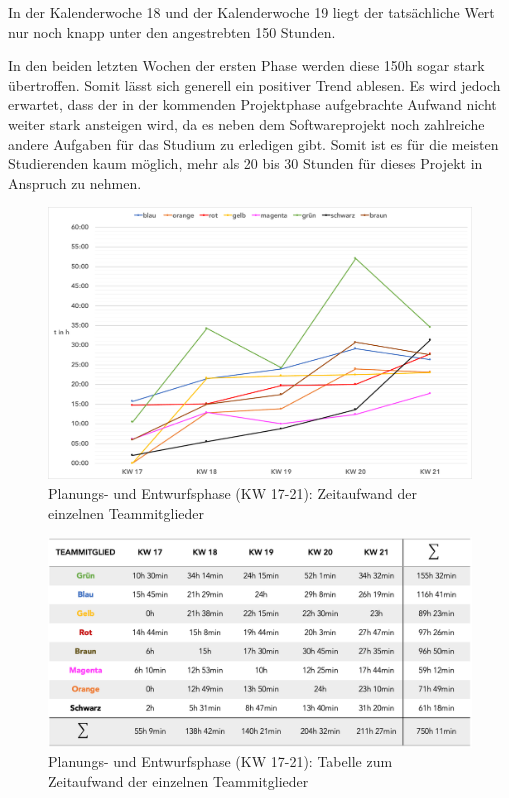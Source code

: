 \documentclass[../review_2.tex]{subfiles}
\begin{document}
In der Kalenderwoche 18 und der Kalenderwoche 19 liegt der tatsächliche Wert nur noch knapp unter den angestrebten 150 Stunden.

In den beiden letzten Wochen der ersten Phase werden diese 150h sogar stark übertroffen.
Somit lässt sich generell ein positiver Trend ablesen. Es wird jedoch erwartet, dass der in der kommenden Projektphase aufgebrachte Aufwand nicht weiter stark ansteigen wird, da es neben dem Softwareprojekt noch zahlreiche andere Aufgaben für das Studium zu erledigen gibt. Somit ist es für die meisten Studierenden kaum möglich, mehr als 20 bis 30 Stunden für dieses Projekt in Anspruch zu nehmen.

\begin{figure} [h]
    \centering
    \includegraphics[width = \linewidth]{img/Kimai3.pdf}
    \caption{Planungs- und Entwurfsphase (KW 17-21): Zeitaufwand der einzelnen Teammitglieder}
    \label{teammitglieder}
\end{figure} 

\begin{figure} [h]
    \centering
    \includegraphics[width = \linewidth]{img/Kimai4.png}
    \caption{Planungs- und Entwurfsphase (KW 17-21): Tabelle zum Zeitaufwand der einzelnen Teammitglieder}
    \label{teammitglieder2}
\end{figure} 
\end{document}
